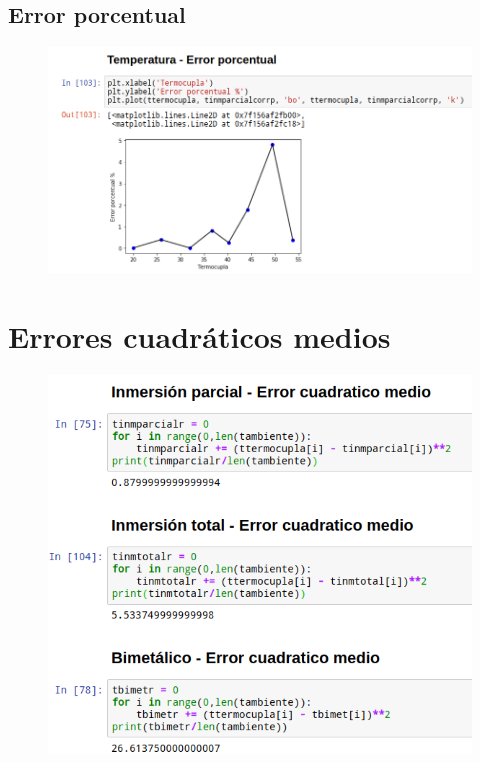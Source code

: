 \documentclass[a4paper,11pt]{report}
\begin{document}
\subsection{Error porcentual}
\begin{figure}[H]
\includegraphics[scale=0.52]{pparcial3.png}
\end{figure}
\section{Errores cuadráticos medios}
\begin{figure}[H]
\includegraphics[scale=0.62]{cuadratico.png}
\end{figure}
\end{document}
